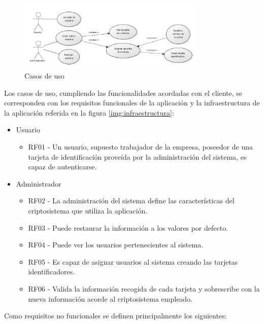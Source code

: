 \documentclass[../PFC.tex]{subfiles}
\begin{document}
\begin{figure}[H]
  \centering
  \includegraphics[width=0.8\textwidth]{./img/usecase1}
  \caption{Casos de uso}
  \label{img:usecase1}
\end{figure}

Los casos de uso, cumpliendo las funcionalidades acordadas con el cliente, se corresponden con los requisitos funcionales de la aplicación y la infraestructura de la aplicación referida en la figura \ref{img:infraestructura}:

\begin{itemize}
\item{Usuario}
	\begin{itemize}
	\item{RF01 - Un usuario, supuesto trabajador de la empresa, poseedor de una tarjeta de identificación proveída por la administración del sistema, es capaz de autenticarse.}
	\end{itemize}
\item{Administrador}
	\begin{itemize}
	\item{RF02 - La administración del sistema define las características del criptosistema que utiliza la aplicación.}
	\item{RF03 - Puede restaurar la información a los valores por defecto.}
	\item{RF04 - Puede ver los usuarios pertenecientes al sistema.}
	\item{RF05 - Es capaz de asignar usuarios al sistema creando las tarjetas identificadores.}
	\item{RF06 - Valida la información recogida de cada tarjeta y sobrescribe con la nueva información acorde al criptosistema empleado.}
	\end{itemize}
\end{itemize}

Como requisitos no funcionales se definen principalmente los siguientes:
\end{document}
